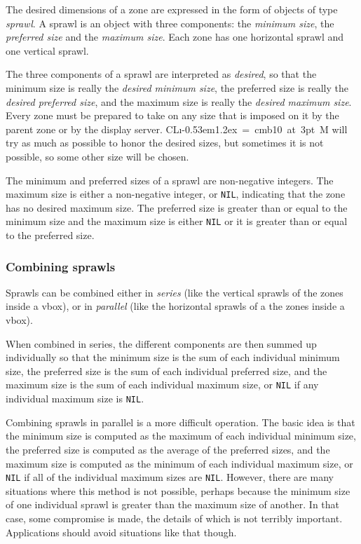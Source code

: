 \documentclass{report}
\def\Tiny{ \font\Tinyfont = cmb10 at 3pt \relax  \Tinyfont}
\def\clim{\textsf{CL{\i}\kern-0.53em\raise1.2ex\hbox{\Tiny 3}M}}
\begin{document}
The desired dimensions of a zone are expressed in the form of objects
of type \emph{sprawl}.  A sprawl is an object with three components:
the \emph{minimum size}, the \emph{preferred size} and the \emph{maximum
  size}.  Each zone has one horizontal sprawl and one vertical sprawl.

The three components of a sprawl are interpreted as \emph{desired}, so
that the minimum size is really the \emph{desired minimum size}, the
preferred size is really the \emph{desired preferred size}, and the
maximum size is really the \emph{desired maximum size}.  Every zone
must be prepared to take on any size that is imposed on it by the
parent zone or by the display server.  \clim{} will try as much as
possible to honor the desired sizes, but sometimes it is not possible,
so some other size will be chosen.

The minimum and preferred sizes of a sprawl are non-negative
integers.  The maximum size is either a non-negative integer, or
\texttt{NIL}, indicating that the zone has no desired maximum size. 
The preferred size is greater than or equal to the minimum size and
the maximum size is either \texttt{NIL} or it is greater than or equal
to the preferred size. 

\subsubsection{Combining sprawls}

Sprawls can be combined either in \emph{series} (like the vertical
sprawls of the zones inside a vbox), or in \emph{parallel} (like the
horizontal sprawls of a the zones inside a vbox).  

When combined in series, the different components are then summed up
individually so that the minimum size is the sum of each individual
minimum size, the preferred size is the sum of each individual
preferred size, and the maximum size is the sum of each individual
maximum size, or \texttt{NIL} if any individual maximum size is
\texttt{NIL}.

Combining sprawls in parallel is a more difficult operation.  The
basic idea is that the minimum size is computed as the maximum of each
individual minimum size, the preferred size is computed as the average
of the preferred sizes, and the maximum size is computed as the
minimum of each individual maximum size, or \texttt{NIL} if all of the
individual maximum sizes are \texttt{NIL}.  However, there are many
situations where this method is not possible, perhaps because the
minimum size of one individual sprawl is greater than the maximum size
of another.  In that case, some compromise is made, the details of
which is not terribly important.  Applications should avoid situations
like that though. 
\end{document}
